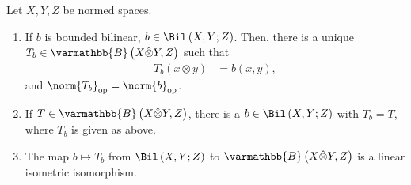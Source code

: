 \documentclass[10pt]{mypackage}
\renewcommand*{\mathbb}[1]{\varmathbb{#1}}
\newcommand{\B}{\mathbb{B}}
\begin{document}
\begin{proposition}
  Let $X,Y,Z$ be normed spaces.
  \begin{enumerate}[(1)]
    \item If $b$ is bounded bilinear, $b\in \Bil\left(X,Y;Z\right)$. Then, there is a unique $T_{b}\in \B\left(X\hat\otimes Y,Z\right)$ such that
      \begin{align*}
        T_{b}\left(x\otimes y\right) &= b\left(x,y\right),
      \end{align*}
      and $\norm{T_{b}}_{\text{op}} = \norm{b}_{\text{op}}$.
    \item If $T\in \B\left(X\hat\otimes Y,Z\right)$, there is a $b\in \Bil\left(X,Y;Z\right)$ with $T_b = T$, where $T_b$ is given as above.
    \item The map $b \mapsto T_{b}$ from $\Bil\left(X,Y;Z\right)$ to $\B\left(X\hat\otimes Y,Z\right)$ is a linear isometric isomorphism.
  \end{enumerate}
\end{proposition}
\end{document}
